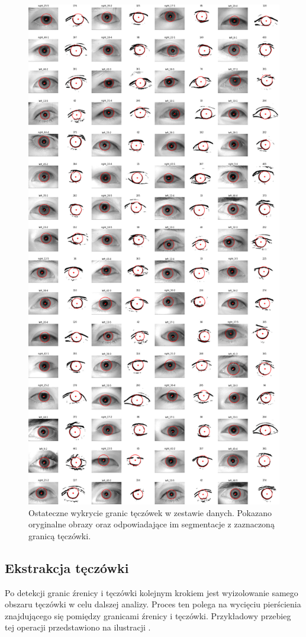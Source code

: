 \documentclass[a4paper]{article}
\begin{document}
\begin{figure}[H]
    \centering
    \includegraphics[width=0.9\linewidth]{figures/irises_detected_many.png}
    \caption{Ostateczne wykrycie granic tęczówek w zestawie danych. Pokazano oryginalne obrazy oraz odpowiadające im segmentacje z zaznaczoną granicą tęczówki.}
    \label{fig:irises_detected_many}
\end{figure}

\subsection{Ekstrakcja tęczówki}
Po detekcji granic źrenicy i tęczówki kolejnym krokiem jest wyizolowanie samego obszaru tęczówki w celu dalszej analizy. Proces ten polega na wycięciu pierścienia znajdującego się pomiędzy granicami źrenicy i tęczówki. Przykładowy przebieg tej operacji przedstawiono na ilustracji .
\end{document}
